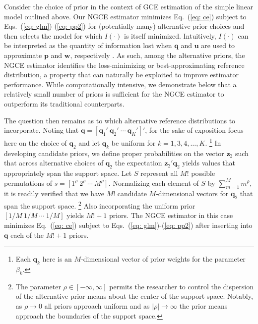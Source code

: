 \documentclass[english]{article}
\begin{document}
Consider the choice of prior in the context of GCE estimation of the simple 
linear model outlined above.
Our NGCE estimator minimizes Eq.\ (\ref{eq: ce}) subject to 
Eqs.\ (\ref{eq: glm})-(\ref{eq: pp2}) for (potentially many) alternative prior 
choices and then selects the model for which $I(\cdot)$ is itself minimized.
Intuitively, $I(\cdot)$ can be interpreted as the quantity of information lost
when $\mathbf{q}$ and $\mathbf{u}$ are used to approximate $\mathbf{p}$
and $\mathbf{w}$, respectively \citep{burnham2002}.
As such, among the alternative priors, the NGCE estimator identifies the 
loss-minimizing or best-approximating reference distribution, a property that
can naturally be exploited to improve estimator performance.
While computationally intensive, we demonstrate below that a relatively small 
number of priors is sufficient for the NGCE estimator to outperform its 
traditional counterparts.

The question then remains as to which alternative reference distributions to 
incorporate.
Noting that $\mathbf{q}=[\mathbf{q}_1' ~ \mathbf{q}_2' ~ 
\cdots ~ \mathbf{q}_K' ]'$, for the sake of exposition focus here on the 
choice of $\mathbf{q}_2$ and let $\mathbf{q}_k$ be uniform for 
$k=1,3,4,\ldots, K$.%
\footnote{Each $\mathbf{q}_k$ here is an $M$-dimensional vector of 
 prior weights for the parameter $\beta_k$.}
In developing candidate priors, we define proper probabilities on the vector 
$\mathbf{z}_2$ such that across alternative choices of $\mathbf{q}_2$ the 
expectation $\mathbf{z}_2'\mathbf{q}_2$  yields values that appropriately
span the support space. 
Let $S$ represent all  $M!$ possible permutations of 
$s = [1^\rho ~ 2^\rho ~ \cdots ~ M^\rho]$.
Normalizing each element of $S$ by $\sum_{m=1}^M m^\rho$, it is 
readily verified that we have $M!$ candidate $M$-dimensional vectors for 
$\mathbf{q}_2$ that span the support space.%
\footnote{The parameter $\rho \in [-\infty, \infty]$ permits the researcher
to control the dispersion of the alternative prior means about the center of the 
support space.
Notably, as $\rho \to 0$ all priors approach uniform and as $|\rho| \to 
\infty$ the prior means approach the boundaries of the support space.}
Also incorporating the uniform prior $[1/M ~ 1/M ~ \cdots ~ 1/M]$ yields 
$M! + 1$ priors.
The NGCE estimator in this case minimizes Eq.\ (\ref{eq: ce}) subject 
to Eqs.\ (\ref{eq: glm})-(\ref{eq: pp2}) after inserting into $\mathbf{q}$ 
each of the $M! + 1$ priors.

\end{document}
